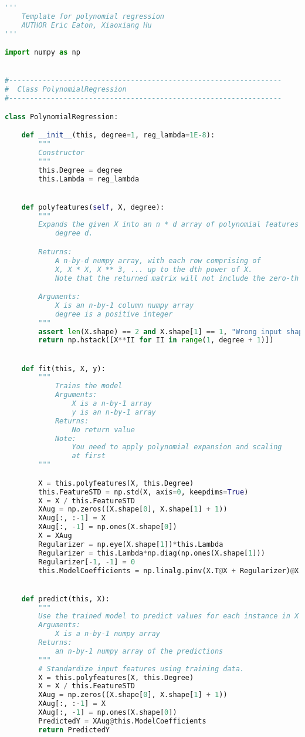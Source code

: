 \documentclass[]{article}
\begin{document}
        \begin{lstlisting}[language=python]
'''
    Template for polynomial regression
    AUTHOR Eric Eaton, Xiaoxiang Hu
'''

import numpy as np


#-----------------------------------------------------------------
#  Class PolynomialRegression
#-----------------------------------------------------------------

class PolynomialRegression:

    def __init__(this, degree=1, reg_lambda=1E-8):
        """
        Constructor
        """
        this.Degree = degree
        this.Lambda = reg_lambda


    def polyfeatures(self, X, degree):
        """
        Expands the given X into an n * d array of polynomial features of
            degree d.

        Returns:
            A n-by-d numpy array, with each row comprising of
            X, X * X, X ** 3, ... up to the dth power of X.
            Note that the returned matrix will not include the zero-th power.

        Arguments:
            X is an n-by-1 column numpy array
            degree is a positive integer
        """
        assert len(X.shape) == 2 and X.shape[1] == 1, "Wrong input shape for X for polyfeatures."
        return np.hstack([X**II for II in range(1, degree + 1)])


    def fit(this, X, y):
        """
            Trains the model
            Arguments:
                X is a n-by-1 array
                y is an n-by-1 array
            Returns:
                No return value
            Note:
                You need to apply polynomial expansion and scaling
                at first
        """

        X = this.polyfeatures(X, this.Degree)
        this.FeatureSTD = np.std(X, axis=0, keepdims=True)
        X = X / this.FeatureSTD
        XAug = np.zeros((X.shape[0], X.shape[1] + 1))
        XAug[:, :-1] = X
        XAug[:, -1] = np.ones(X.shape[0])
        X = XAug
        Regularizer = np.eye(X.shape[1])*this.Lambda
        Regularizer = this.Lambda*np.diag(np.ones(X.shape[1]))
        Regularizer[-1, -1] = 0
        this.ModelCoefficients = np.linalg.pinv(X.T@X + Regularizer)@X.T@y


    def predict(this, X):
        """
        Use the trained model to predict values for each instance in X
        Arguments:
            X is a n-by-1 numpy array
        Returns:
            an n-by-1 numpy array of the predictions
        """
        # Standardize input features using training data.
        X = this.polyfeatures(X, this.Degree)
        X = X / this.FeatureSTD
        XAug = np.zeros((X.shape[0], X.shape[1] + 1))
        XAug[:, :-1] = X
        XAug[:, -1] = np.ones(X.shape[0])
        PredictedY = XAug@this.ModelCoefficients
        return PredictedY




\end{lstlisting}
\end{document}
